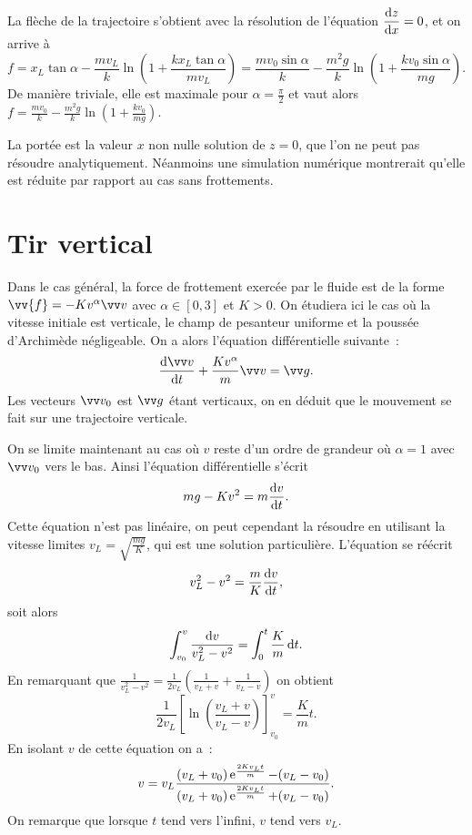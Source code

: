La flèche de la trajectoire s'obtient avec la résolution de l'équation $\dfrac{\mathrm{d} z}{\mathrm{d} x}=0$, et on arrive à
\begin{equation}
  f = x_L \tan \alpha - \frac{mv_L}{k}\ln\left(1 + \frac{k x_L \tan \alpha}{m v_L}\right) = \frac{m v_0 \sin \alpha}{k} - \frac{m^2 g}{k}\ln\left(1 + \frac{k v_0 \sin \alpha}{m g}\right).
\end{equation}
De manière triviale, elle est maximale pour $\alpha = \frac{\pi}{2}$ et vaut alors $f =  \frac{m v_0}{k} - \frac{m^2 g}{k}\ln\left(1 + \frac{k v_0}{m g}\right)$.

La portée est la valeur $x$ non nulle solution de $z=0$, que l'on ne peut pas résoudre analytiquement. Néanmoins une simulation numérique montrerait qu'elle est réduite par rapport au cas sans frottements.

\section{Tir vertical}
\label{chap3-sec:tirvertical}

Dans le cas général, la force de frottement exercée par le fluide est de la forme $\vv{f}=-Kv^\alpha\vvv$ avec $\alpha \in [0, 3]$ et $K>0$. On étudiera ici le cas où la vitesse initiale est verticale, le champ de pesanteur uniforme et la poussée d'Archimède négligeable. On a alors l'équation différentielle suivante~:
\begin{equation}
  \derived{\vvv}{t} + \frac{Kv^\alpha}{m}\vvv = \vg.
\end{equation}
Les vecteurs $\vvv_0$ est $\vg$ étant verticaux, on en déduit que le mouvement se fait sur une trajectoire verticale.

On se limite maintenant au cas où $v$ reste d'un ordre de grandeur où $\alpha=1$ avec $\vvv_0$ vers le bas. Ainsi l'équation différentielle s'écrit
\begin{equation}
  mg -Kv^2 = m\dfrac{\mathrm{d} v}{\mathrm{d} t}.
\end{equation}
Cette équation n'est pas linéaire, on peut cependant la résoudre en utilisant la vitesse limites $v_L = \sqrt{\frac{mg}{K}}$, qui est une solution particulière. L'équation se réécrit
\begin{equation}
  v_L^2-v^2 = \frac{m}{K}\dfrac{\mathrm{d} v}{\mathrm{d} t},
\end{equation}
soit alors
\begin{equation}
  \int_{v_0}^v \frac{\mathop{}\mathopen{}\mathrm{d} v}{v_L^2-v^2} = \int_0^t\frac{K}{m}\mathop{}\mathopen{}\mathrm{d} t.
\end{equation}
En remarquant que $\frac{1}{v_L^2-v^2} = \frac{1}{2 v_L}\left(\frac{1}{v_L+v}+\frac{1}{v_L-v}\right)$ on obtient
\begin{equation}
  \frac{1}{2v_L}\left[\ln\left(\frac{v_L+v}{v_L-v}\right)\right]^{v}_{v_0} = \frac{K}{m}t.
\end{equation}
En isolant $v$ de cette équation on a~:
\begin{equation}
  v = v_L \frac{(v_L+v_0)\operatorname{e}^{\frac{2K v_L t}{m}}-(v_L-v_0)}{(v_L+v_0)\operatorname{e}^{\frac{2K v_L t}{m}}+(v_L-v_0)}.
\end{equation}
On remarque que lorsque $t$ tend vers l'infini, $v$ tend vers $v_L$.

